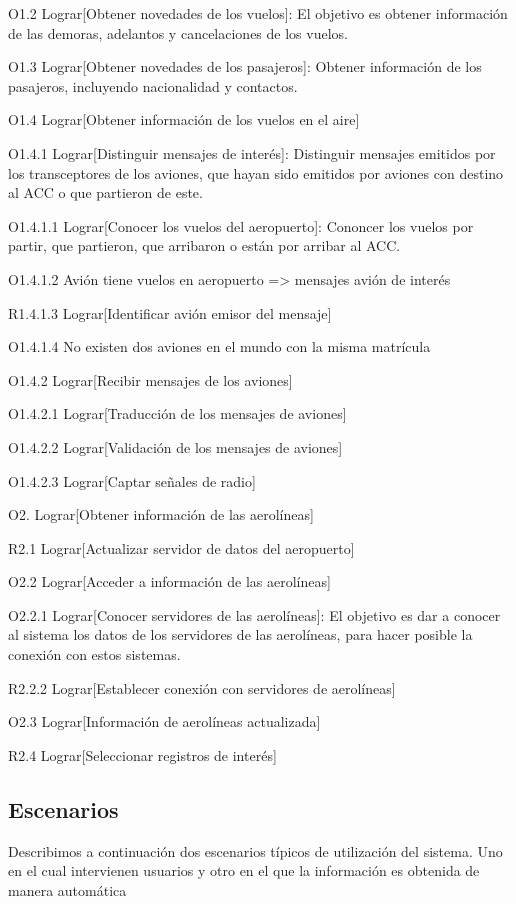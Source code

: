 O1.2         Lograr[Obtener novedades de los vuelos]: El objetivo es obtener información de las demoras, adelantos y cancelaciones de los vuelos.

O1.3         Lograr[Obtener novedades de los pasajeros]: Obtener información de los pasajeros, incluyendo nacionalidad y contactos.

O1.4         Lograr[Obtener información de los vuelos en el aire]

O1.4.1       Lograr[Distinguir mensajes de interés]: Distinguir mensajes emitidos por los transceptores de los aviones, que hayan sido emitidos por aviones con destino al ACC o que partieron de este.

O1.4.1.1     Lograr[Conocer los vuelos del aeropuerto]: Cononcer los vuelos por partir, que partieron, que arribaron o están por arribar al ACC.

O1.4.1.2     Avión tiene vuelos en aeropuerto => mensajes avión de interés

R1.4.1.3     Lograr[Identificar avión emisor del mensaje]

O1.4.1.4     No existen dos aviones en el mundo con la misma matrícula

O1.4.2       Lograr[Recibir mensajes de los aviones]

O1.4.2.1     Lograr[Traducción de los mensajes de aviones]

O1.4.2.2     Lograr[Validación de los mensajes de aviones]

O1.4.2.3     Lograr[Captar señales de radio]

O2.          Lograr[Obtener información de las aerolíneas]

R2.1         Lograr[Actualizar servidor de datos del aeropuerto]

O2.2         Lograr[Acceder a información de las aerolíneas]

O2.2.1       Lograr[Conocer servidores de las aerolíneas]: El objetivo es dar a conocer al sistema los datos de los servidores de las aerolíneas, para hacer posible la conexión con estos sistemas.

R2.2.2       Lograr[Establecer conexión con servidores de aerolíneas]

O2.3         Lograr[Información de aerolíneas actualizada]

R2.4         Lograr[Seleccionar registros de interés]

\subsection{Escenarios}
Describimos a continuación dos escenarios típicos de utilización del sistema. Uno en el cual intervienen usuarios y otro en el que la información es obtenida de manera automática

